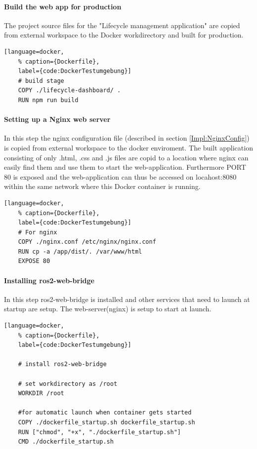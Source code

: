 \paragraph*{Build the web app for production} The project source files for the "Lifecycle management application" are copied from external workspace to the Docker workdirectory and built for production.
\begin{lstlisting}[language=docker,
	% caption={Dockerfile}, 
	label={code:DockerTestumgebung}]
	# build stage
	COPY ./lifecycle-dashboard/ .
	RUN npm run build
\end{lstlisting}

\paragraph{Setting up a Nginx web server} In this step the nginx configuration file (described in section \ref{Impl:NginxConfig}) is copied from external workspace to the docker enviroment. The built application consisting of only .html, .css and .js files are copid to a location where nginx can easily find them and use them to start the web-application. Furthermore PORT 80 is exposed and the web-application can thus be accessed on locahost:8080 within the same network where this Docker container is running.
\begin{lstlisting}[language=docker,
	% caption={Dockerfile}, 
	label={code:DockerTestumgebung}]
	# For nginx
	COPY ./nginx.conf /etc/nginx/nginx.conf
	RUN cp -a /app/dist/. /var/www/html
	EXPOSE 80
\end{lstlisting}

\paragraph*{Installing ros2-web-bridge} In this step ros2-web-bridge is installed and other services that need to launch at startup are setup. The web-server(nginx) is setup to start at launch.
\begin{lstlisting}[language=docker,
	% caption={Dockerfile}, 
	label={code:DockerTestumgebung}]
	
	# install ros2-web-bridge

	# set workdirectory as /root
	WORKDIR /root

	#for automatic launch when container gets started 
	COPY ./dockerfile_startup.sh dockerfile_startup.sh
	RUN ["chmod", "+x", "./dockerfile_startup.sh"]
	CMD ./dockerfile_startup.sh	
\end{lstlisting}

